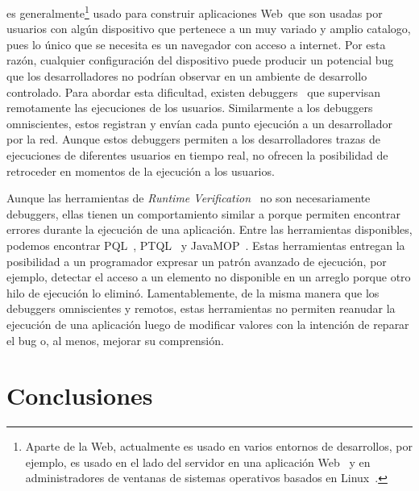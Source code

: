 \documentclass[conference]{IEEEtran}
\begin{document}
\smallskip

 \javascript es generalmente\footnote{Aparte de la Web, \javascript actualmente es usado en varios entornos de desarrollos, por ejemplo, es usado en el lado del servidor en una aplicaci\'on Web~\cite{nodejs:2018} y en administradores de ventanas de sistemas operativos basados en Linux~\cite{gjs}.} usado para construir aplicaciones Web\ que son usadas por usuarios con alg\'un dispositivo que pertenece a un muy variado y amplio catalogo, pues lo \'unico que se necesita es un navegador con acceso a internet. Por esta raz\'on, cualquier configuraci\'on del dispositivo puede producir un potencial bug que los desarrolladores no podr\'ian observar en un ambiente de desarrollo controlado. Para abordar esta dificultad, existen debuggers~\cite{sessionstack,raygun,trackjs} que supervisan remotamente las ejecuciones de los usuarios. Similarmente a los debuggers omniscientes, estos registran y env\'ian cada punto ejecuci\'on a un desarrollador por la red. Aunque estos debuggers permiten a los desarrolladores trazas de ejecuciones de diferentes usuarios en tiempo real, no ofrecen la posibilidad de retroceder en momentos de la ejecuci\'on a los usuarios.   

\smallskip

Aunque las herramientas de {\em Runtime Verification}~\cite{meredith:phd} no son necesariamente debuggers, ellas tienen un comportamiento similar a \deloreanjs porque permiten encontrar errores durante la ejecuci\'on de una aplicaci\'on. Entre las herramientas disponibles, podemos encontrar PQL~\cite{martinAl:oopsla2005}, PTQL~\cite{goldsmithAl:oopsla2005} y JavaMOP~\cite{meredithAl:jsttt2011,chen:oopsla2007}. Estas herramientas entregan la posibilidad a un programador expresar un patr\'on avanzado de ejecuci\'on, por ejemplo, detectar el acceso a un elemento no disponible en un arreglo porque otro hilo de ejecuci\'on lo elimin\'o. Lamentablemente, de la misma manera que los debuggers omniscientes y remotos, estas herramientas no permiten reanudar la ejecuci\'on de una aplicaci\'on luego de modificar valores con la intenci\'on de reparar el bug o, al menos, mejorar su comprensi\'on.    

\section{Conclusiones}
\label{sec:conc}
\end{document}
